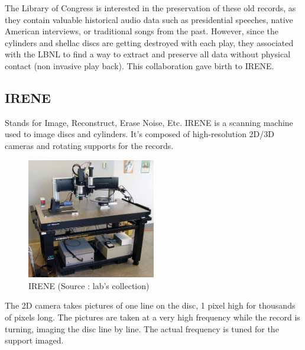 \documentclass[12pt, twoside]{article}
\begin{document}
The Library of Congress is interested in the preservation of these old records, as they contain valuable historical audio data such as presidential speeches, native American interviews, or traditional songs from the past. However, since the cylinders and shellac discs are getting destroyed with each play, they associated with the LBNL to find a way to extract and preserve all data without physical contact (non invasive play back). This collaboration gave birth to IRENE.
\subsection{IRENE}
Stands for Image, Reconstruct, Erase Noise, Etc.
IRENE is a scanning machine used to image discs and cylinders. It's composed of high-resolution 2D/3D cameras and rotating supports for the records.

\begin{figure}[H]
	\centering
	\includegraphics[width=0.5\textwidth]{../images/IRENE.jpg}
	\caption{IRENE (Source : lab's collection)}
	\label{irene}
\end{figure}

The 2D camera takes pictures of one line on the disc, 1 pixel high for thousands of pixels long. The pictures are taken at a very high frequency while the record is turning, imaging the disc line by line. The actual frequency is tuned for the support imaged.
\end{document}
